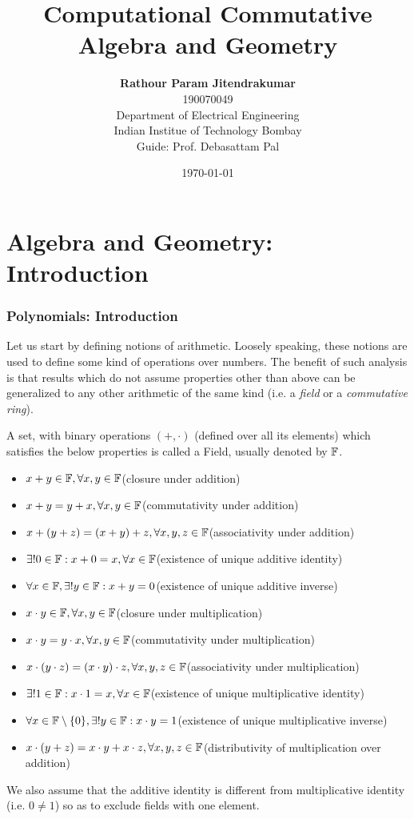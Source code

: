 \documentclass[a4paper,11pt]{article}
\title{Computational Commutative Algebra and Geometry}
\author{%
    {\LARGE\textbf{Rathour Param Jitendrakumar}}\\[0.4em]
    {\Large 190070049}\\[0.4em]
    {\Large Department of Electrical Engineering}\\[0.4em]
    {\Large Indian Institue of Technology Bombay}\\[0.4em]
    {\Large  Guide: Prof. Debasattam Pal}}
\date{\today}
\begin{document}


\setcounter{tocdepth}{2}
\tableofcontents
\clearpage
{}
% 
\part{Algebra and Geometry: Introduction}
\section{Polynomials: Introduction}
Let us start by defining notions of arithmetic. Loosely speaking, these notions are used to define some kind of operations over numbers. The benefit of such analysis is that results which do not assume properties other than above can be generalized to any other arithmetic of the same kind (i.e. a \emph{field} or a \emph{commutative ring}).
\begin{defn}[Field]
    A set, with binary operations $(+,\cdot)$ (defined over all its elements) which satisfies the below properties is called a Field, usually denoted by $\mathbb{F}$.
    \begin{itemize}
        \item $x+y\in \mathbb{F}, \forall x,y\in \mathbb{F}$\hfill(closure under addition)
        \item $x+y=y+x, \forall x,y\in \mathbb{F}$\hfill(commutativity under addition)
        \item $x+(y+z)=(x+y)+z, \forall x,y,z\in \mathbb{F}$\hfill(associativity under addition)
        \item $\exists! 0 \in \mathbb{F}: x+0 = x, \forall x \in \mathbb{F}$\hfill(existence of unique additive identity)
        \item $\forall x \in \mathbb{F}, \exists! y \in \mathbb{F}: x+y = 0$\hfill(existence of unique additive inverse)
        \item $x\cdot y\in \mathbb{F}, \forall x,y\in \mathbb{F}$\hfill(closure under multiplication)
        \item $x\cdot y=y\cdot x, \forall x,y\in \mathbb{F}$\hfill(commutativity under multiplication)
        \item $x\cdot (y\cdot z)=(x\cdot y)\cdot z, \forall x,y,z\in \mathbb{F}$\hfill(associativity under multiplication)
        \item $\exists! 1 \in \mathbb{F}: x\cdot 1 = x, \forall x \in \mathbb{F}$\hfill(existence of unique multiplicative identity)
        \item $\forall x \in \mathbb{F}\setminus\{0\}, \exists! y \in \mathbb{F}: x\cdot y = 1$\hfill(existence of unique multiplicative inverse)
        \item $x\cdot(y+z)=x\cdot y + x\cdot z, \forall x,y,z \in \mathbb{F} $\hfill(distributivity of multiplication over addition)
    \end{itemize}
\begin{note}
    We also assume that the additive identity is different from multiplicative identity (i.e. $0\neq 1$) so as to exclude fields with one element.
\end{note}
\end{defn}
\end{document}
